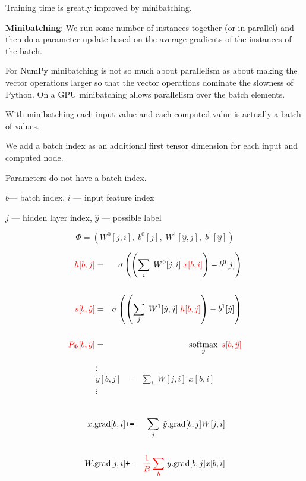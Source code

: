 {Training time is greatly improved by minibatching.

 \vfill
{\bf Minibatching}: We run some number of instances together (or in parallel) and then do a parameter update based on the average
gradients of the instances of the batch.

\vfill
For NumPy minibatching is not so much about parallelism as about making the vector operations larger so that the vector operations dominate
the slowness of Python.  On a GPU minibatching allows parallelism over the batch elements.
\vfill

\vfill
With minibatching each input value and each computed value is actually a batch of values.

\vfill
We add a batch index as an additional first tensor dimension for each input and computed node.

\vfill
Parameters do not have a batch index.


\centerline{$b$--- batch index,\hspace{3em} $i$ --- input feature index}
\centerline{$j$ --- hidden layer index, \hspace{3em} $\hat{y}$ --- possible label}
$$\Phi = (W^0[j,i],\;b^0[j],\;W^1[\hat{y},j],\;b^1[\hat{y}])$$

\vfill
\begin{eqnarray*}
  {\color{red} h[b,j]} & = & \sigma\left(\left(\sum_i\;W^0[j,i] \;{\color{red} x[b,i]}\right) - b^0[j]\right) \\
  \\
  {\color{red} s[b,\hat{y}]} & = & \sigma\left(\left(\sum_j\;W^1[\hat{y},j]\;{\color{red} h[b,j]}\right) - b^1[\hat{y}]\right) \\
  \\
  {\color{red} P_\Phi[b,\hat{y}]} & = & \operatorname*{softmax}_{\hat{y}}\;{\color{red} s[b,\hat{y}]}
\end{eqnarray*}

\vspace{-3ex}
\begin{eqnarray*}
\vdots \\
  \tilde{y}[b,j] & = & \sum_i\;W[j,i]\;x[b,i] \\
  \vdots
  \end{eqnarray*}

  \begin{eqnarray*}
  \\
  x.\mathrm{grad}[b,i] & \mbox{\tt +=} & \sum_j\;\tilde{y}.\mathrm{grad}[b,j]W[j,i] \\
  \\
  W.\mathrm{grad}[j,i] & \mbox{\tt +=} & {\color{red} \frac{1}{B} \sum_b}\;\tilde{y}.\mathrm{grad}[b,j]x[b,i]
\end{eqnarray*}

}
